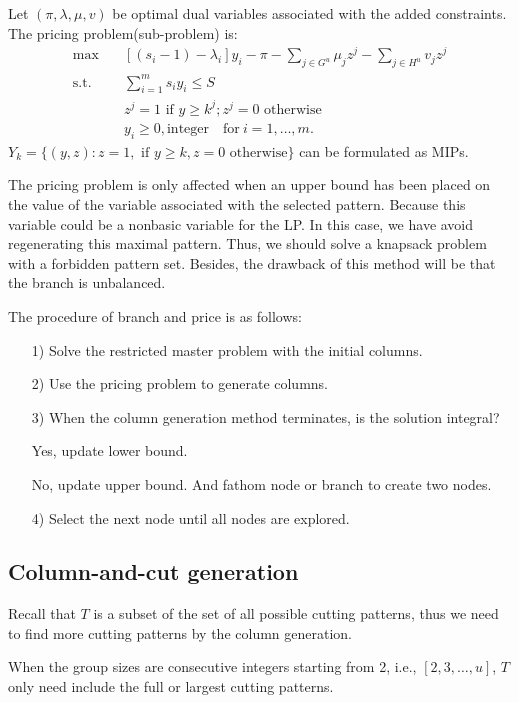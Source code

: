Let $(\pi,\lambda,\mu,v)$ be optimal dual variables associated with the added constraints.
The pricing problem(sub-problem) is:
\[\begin{split}\mbox{max}\quad & \left[(s_i-1) -\lambda_i\right] y_{i}- \pi - \sum_{j\in G^u}\mu_j z^j - \sum_{j\in H^u}v_j z^j \\
\mbox{s.t.} \quad & \sum_{i=1}^m s_i y_i \leq S  \\
& z^j =1 \mbox{ if } y \geq k^j; z^j =0 \mbox{ otherwise}  \\
& y_i \geq 0, \mbox{integer}\quad \mbox{for}~ i=1,\ldots,m.
\end{split}\]
$Y_k = \{(y,z): z=1,\text{ if } y \geq k,z=0 \text{ otherwise} \}$ can be formulated as MIPs.

The pricing problem is only affected when an upper bound has been placed on the value of the variable associated with the selected pattern. Because this variable could be a nonbasic variable for the LP. In this case, we have avoid regenerating this maximal pattern. Thus, we should solve a knapsack problem with a forbidden pattern set. Besides, the drawback of this method will be that the branch is unbalanced.

The procedure of branch and price is as follows:

\begin{itemize}
  \item [1)] Solve the restricted master problem with the initial columns.
  \item [2)] Use the pricing problem to generate columns.
  \item [3)] When the column generation method terminates, is the solution integral?

  Yes, update lower bound.

  No, update upper bound. And fathom node or branch to create two nodes.

  \item [4)] Select the next node until all nodes are explored.
\end{itemize}

\subsection{Column-and-cut generation}

Recall that $T$ is a subset of the set of all possible cutting patterns, thus we need to find more cutting patterns by the column generation.

\begin{lem}\label{full_cutting_pattern}
When the group sizes are consecutive integers starting from 2, i.e., $[2,3,\ldots,u]$, $T$ only need include the full or largest cutting patterns.
\end{lem}

